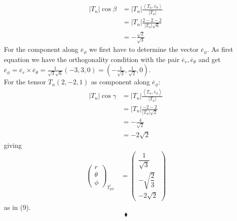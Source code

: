 \begin{align}
\left|T_n \right|\cos \beta &= \left|T_n \right|\frac{\left<T_n,\overline{e}_{\theta}  \right>}{\left|T_n \right|}\\
&= \left|T_n \right|\frac{2-2-2}{\left|T_n \right|\sqrt{6}}\\
&= -\frac{\sqrt{2}}{\sqrt{3}}
\end{align}
For the component along $\overline{e}_{\phi}$ we first have to determine the vector $\overline{e}_{\phi}$. As first equation we have the orthogonality condition with the pair $\overline{e}_r,\overline{e}_{\theta}$  and  get $\overline{e}_{\phi} = \overline{e}_r \times \overline{e}_{\theta}  =  \frac{1}{\sqrt{3}\sqrt{6}}\left( -3,3,0\right)= \left( -\frac{1}{\sqrt{2}},\frac{1}{\sqrt{2}},0\right)$.\\
For the tensor $T_n (2,-2,1)$  as component along $\overline{e}_{\phi}$:
\begin{align}
\left|T_n \right|\cos \gamma &= \left|T_n \right|\frac{\left<T_n,\overline{e}_{\phi}  \right>}{\left|T_n \right|}\\
&= \left|T_n \right|\frac{-2-2}{\left|T_n \right|\sqrt{2}}\\
&= -\frac{4}{\sqrt{2}}\\
&= -2\sqrt{2}
\end{align}
giving
\begin{align}
\begin{pmatrix}
r\\
\theta\\
\phi
\end{pmatrix}_{T^{'}_{ph.}}
&=\begin{pmatrix}
\dfrac {1}{\sqrt{3}}\\
-\sqrt{\dfrac {{2}}{{3}}}\\
-2\sqrt{2}
\end{pmatrix}
\end{align}
as in (9).
$$\blacklozenge$$
\newpage



